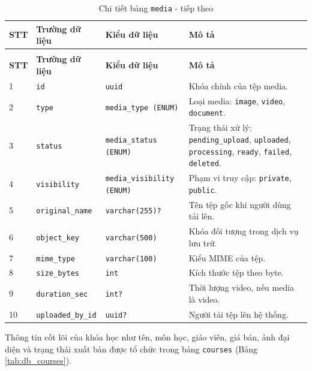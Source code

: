 \documentclass[../DoAn.tex]{subfiles}
\begin{document}
{\begin{longtable}{|p{}|p{}|p{}|p{}|}
\caption{Chi tiết bảng \texttt{media}}
\label{tab:db_media}\\
\hline
\textbf{STT} & \textbf{Trường dữ liệu} & \textbf{Kiểu dữ liệu} & \textbf{Mô tả} \\ \hline
\endfirsthead
\caption[]{Chi tiết bảng \texttt{media} - tiếp theo}\\
\hline
\textbf{STT} & \textbf{Trường dữ liệu} & \textbf{Kiểu dữ liệu} & \textbf{Mô tả} \\ \hline
\endhead
1 & \texttt{id} & \texttt{uuid} & Khóa chính của tệp media. \\ \hline
2 & \texttt{type} & \texttt{media\_type (ENUM)} & Loại media: \texttt{image}, \texttt{video}, \texttt{document}. \\ \hline
3 & \texttt{status} & \texttt{media\_status (ENUM)} & Trạng thái xử lý: \texttt{pending\_upload}, \texttt{uploaded}, \texttt{processing}, \texttt{ready}, \texttt{failed}, \texttt{deleted}. \\ \hline
4 & \texttt{visibility} & \texttt{media\_visibility (ENUM)} & Phạm vi truy cập: \texttt{private}, \texttt{public}. \\ \hline
5 & \texttt{original\_name} & \texttt{varchar(255)?} & Tên tệp gốc khi người dùng tải lên. \\ \hline
6 & \texttt{object\_key} & \texttt{varchar(500)} & Khóa đối tượng trong dịch vụ lưu trữ. \\ \hline
7 & \texttt{mime\_type} & \texttt{varchar(100)} & Kiểu MIME của tệp. \\ \hline
8 & \texttt{size\_bytes} & \texttt{int} & Kích thước tệp theo byte. \\ \hline
9 & \texttt{duration\_sec} & \texttt{int?} & Thời lượng video, nếu media là video. \\ \hline
10 & \texttt{uploaded\_by\_id} & \texttt{uuid?} & Người tải tệp lên hệ thống. \\ \hline
\end{longtable}

Thông tin cốt lõi của khóa học như tên, môn học, giáo viên, giá bán, ảnh đại diện và trạng thái xuất bản được tổ chức trong bảng \texttt{courses} (Bảng \ref{tab:db_courses}).

}
\end{document}
